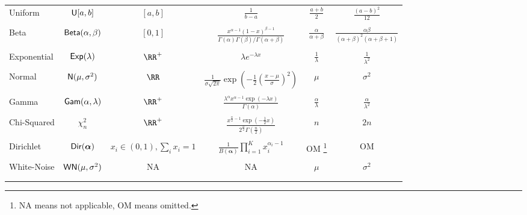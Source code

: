 \begin{longtable}{lccccc}
    Uniform           & ${\sf U} [a,b]$             & $[a,b]$                        & $\frac{1}{b-a}$                                                                                          & $\frac{a+b}{2}$          & $\frac{(a-b)^2}{12}$       \\\\
    Beta              & ${\sf Beta} (\alpha , \beta)$ & $[0,1]$                        & $\frac{x^{\alpha - 1} {(1-x)}^{\beta - 1}}{\Gamma (\alpha) \Gamma (\beta) / \Gamma (\alpha + \beta)}$    & $\frac{\alpha}{\alpha + \beta}$          & $\frac{\alpha \beta}{(\alpha + \beta)^2 (\alpha + \beta + 1)}$       \\\\
    Exponential       & ${\sf Exp} (\lambda)$         & $\RR^{+}$                      & $\lambda e^{-\lambda x}$                                                                                 & $\frac{1}{\lambda}$      & $\frac{1}{\lambda^2}$        \\\\
    Normal            & ${\sf N} (\mu, \sigma^2)$   & $\RR$                          & $\frac{1}{\sigma \sqrt{2 \pi}} \exp \left( -\frac{1}{2} \left( \frac{x - \mu}{\sigma} \right)^2 \right)$ & $\mu$                    & $\sigma^2$                 \\\\
    Gamma             & ${\sf Gam} (\alpha, \lambda)$ & $\RR^{+}$                      & $\frac{\lambda^{\alpha} x^{\alpha - 1} \exp (-\lambda x)}{\Gamma (\alpha)}$                              & $\frac{\alpha}{\lambda}$ & $\frac{\alpha}{\lambda^2}$ \\\\
    Chi-Squared       & $\chi^2_{n}$             & $\RR^{+}$                      & $\frac{x^{\frac{n}{2} - 1} \exp (-\frac{1}{2} x)}{2^{\frac{n}{2}} \Gamma (\frac{n}{2})}$                 & $n$                      & $2n$                       \\\\
    Dirichlet       & ${\sf Dir} (\bm{\alpha})$             & $x_i \in (0,1), \sum_i x_i = 1$                      & $\frac{1}{B(\bm{\alpha})} \prod_{i=1}^{K} x_i^{\alpha_i - 1}$                 & OM \footnote{NA means not applicable, OM means omitted.}                      & OM                       \\\\
    White-Noise       & ${\sf WN} (\mu , \sigma^2)$   & NA                             & NA                                                                                                       & $\mu$                    & $\sigma^2$                 \\\\

    \\\bottomrule
    \hline
\end{longtable}
